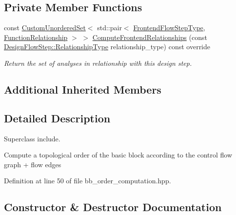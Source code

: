 \subsection*{Private Member Functions}
\begin{DoxyCompactItemize}
\item 
const \hyperlink{classCustomUnorderedSet}{Custom\+Unordered\+Set}$<$ std\+::pair$<$ \hyperlink{frontend__flow__step_8hpp_afeb3716c693d2b2e4ed3e6d04c3b63bb}{Frontend\+Flow\+Step\+Type}, \hyperlink{classFrontendFlowStep_af7cf30f2023e5b99e637dc2058289ab0}{Function\+Relationship} $>$ $>$ \hyperlink{classBBOrderComputation_a1cdada91e19bdbec7dc8da77c52ee446}{Compute\+Frontend\+Relationships} (const \hyperlink{classDesignFlowStep_a723a3baf19ff2ceb77bc13e099d0b1b7}{Design\+Flow\+Step\+::\+Relationship\+Type} relationship\+\_\+type) const override
\begin{DoxyCompactList}\small\item\em Return the set of analyses in relationship with this design step. \end{DoxyCompactList}\end{DoxyCompactItemize}
\subsection*{Additional Inherited Members}


\subsection{Detailed Description}
Superclass include. 

Compute a topological order of the basic block according to the control flow graph + flow edges 

Definition at line 50 of file bb\+\_\+order\+\_\+computation.\+hpp.



\subsection{Constructor \& Destructor Documentation}
\mbox{\label{classBBOrderComputation_a9e29d78ff223ee84cf49d7c4c7e59336}} 
